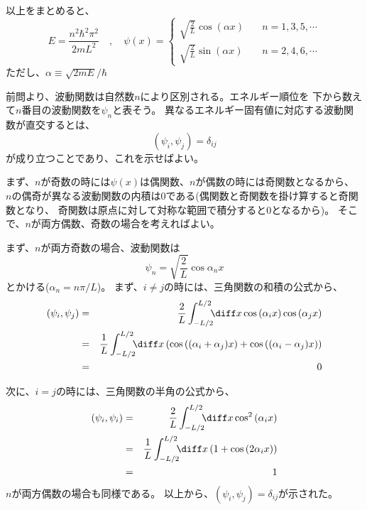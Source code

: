 以上をまとめると、
\begin{equation}
  E = \frac{n^2 \hbar^2 \pi^2}{2mL^2} \quad , \quad
  \psi(x) =
  \left\{
  \begin{array}{cc}
    \sqrt{\frac{2}{L}} \cos (\alpha x) & \quad n = 1,3,5,\cdots \\
    \sqrt{\frac{2}{L}} \sin (\alpha x) & \quad n = 2,4,6,\cdots
  \end{array}
  \right.
\end{equation}
ただし、$\alpha \equiv \sqrt{2mE}/\hbar$

前問より、波動関数は自然数$n$により区別される。エネルギー順位を
下から数えて$n$番目の波動関数を$\psi_n$と表そう。
異なるエネルギー固有値に対応する波動関数が直交するとは、
\begin{equation}
  (\psi_i,\psi_j) = \delta_{ij}
\end{equation}
が成り立つことであり、これを示せばよい。

まず、$n$が奇数の時には$\psi(x)$は偶関数、$n$が偶数の時には奇関数となるから、
$n$の偶奇が異なる波動関数の内積は$0$である(偶関数と奇関数を掛け算すると奇関数となり、
奇関数は原点に対して対称な範囲で積分すると$0$となるから)。
そこで、$n$が両方偶数、奇数の場合を考えればよい。

まず、$n$が両方奇数の場合、波動関数は
\begin{equation}
  \psi_n = \sqrt{\frac{2}{L}} \cos \alpha_n x
\end{equation}
とかける($\alpha_n = n \pi/L$)。
まず、$i \neq j$の時には、三角関数の和積の公式から、
\begin{eqnarray*}
  (\psi_i,\psi_j)& =& \frac{2}{L} \int_{-L/2}^{L/2} \!\!\! \diff x  \cos{(\alpha_i x)}  \cos{(\alpha_j x)}  \\
  &=& \frac{1}{L} \int_{-L/2}^{L/2} \!\!\! \diff x \left( \cos{((\alpha_i+\alpha_j) x)}  + \cos{((\alpha_i-\alpha_j) x)} \right)\\
  &=& 0
\end{eqnarray*}

次に、$i = j$の時には、三角関数の半角の公式から、
\begin{eqnarray*}
  (\psi_i,\psi_i)& =& \frac{2}{L} \int_{-L/2}^{L/2} \!\!\! \diff x  \cos^2{(\alpha_i x)}  \\
  &=& \frac{1}{L} \int_{-L/2}^{L/2} \!\!\! \diff x \left(
  1 +  \cos{(2\alpha_i x)}
  \right) \\
  &=& 1
\end{eqnarray*}
$n$が両方偶数の場合も同様である。
以上から、$(\psi_i,\psi_j) = \delta_{ij}$が示された。

